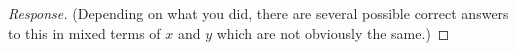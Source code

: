 \documentclass[11pt]{exam}
\DeclarePairedDelimiter\abs{\lvert}{\rvert}%
\begin{document}
\begin{questions}
\begin{parts}
\begin{proof}[Response]
(Depending on what you did, there are several possible correct answers to this in mixed terms of $x$ and $y$ which are not obviously the same.)
	\end{proof}
\end{parts} 
\addpoints

\end{questions}
\end{document}
